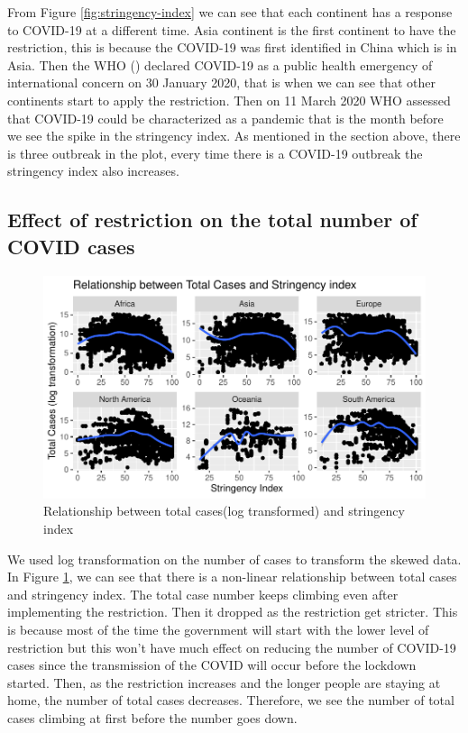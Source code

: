 \documentclass[11pt,a4paper,]{article}
\begin{document}
From Figure \ref{fig:stringency-index} we can see that each continent has a response to COVID-19 at a different time. Asia continent is the first continent to have the restriction, this is because the COVID-19 was first identified in China which is in Asia. Then the WHO (\textcite{who}) declared COVID-19 as a public health emergency of international concern on 30 January 2020, that is when we can see that other continents start to apply the restriction. Then on 11 March 2020 WHO assessed that COVID-19 could be characterized as a pandemic that is the month before we see the spike in the stringency index. As mentioned in the section above, there is three outbreak in the plot, every time there is a COVID-19 outbreak the stringency index also increases.

\clearpage

\subsection*{Effect of restriction on the total number of COVID cases}

\begin{figure}

{\centering \includegraphics{report_files/figure-latex/relationship-tot-index-1} 

}

\caption{Relationship between total cases(log transformed) and stringency index}\label{fig:relationship-tot-index}
\end{figure}

We used log transformation on the number of cases to transform the skewed data. In Figure \ref{fig:relationship-tot-index}, we can see that there is a non-linear relationship between total cases and stringency index. The total case number keeps climbing even after implementing the restriction. Then it dropped as the restriction get stricter. This is because most of the time the government will start with the lower level of restriction but this won't have much effect on reducing the number of COVID-19 cases since the transmission of the COVID will occur before the lockdown started. Then, as the restriction increases and the longer people are staying at home, the number of total cases decreases. Therefore, we see the number of total cases climbing at first before the number goes down.
\end{document}
